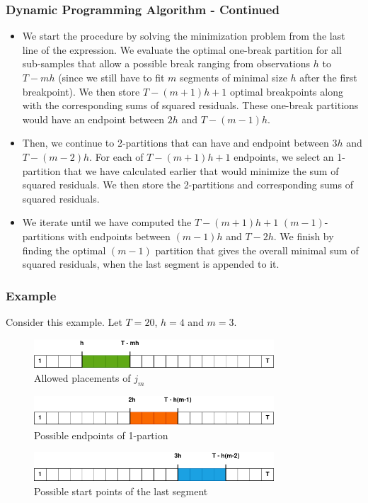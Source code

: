 \documentclass[presentation.tex]{subfiles}
\begin{document}
\begin{frame}
  \frametitle{Dynamic Programming Algorithm - Continued}
  \begin{itemize}
  \item 
We start the procedure by solving the minimization problem from the
last line of the expression. We evaluate the optimal one-break partition for all
sub-samples that allow a possible break ranging from observations $h$ to
$T - mh$ (since we still have to fit $m$ segments of minimal size $h$ after
the first breakpoint). We then store $T - (m + 1)h + 1$ optimal breakpoints
along with the corresponding sums of squared residuals. These one-break
partitions would have an endpoint between $2h$ and $T - (m-1)h$. 
\item 
Then, we continue to 2-partitions that can have and endpoint between $3h$ and
$T - (m-2)h$. For each of $T - (m + 1)h + 1$ endpoints, we select an
1-partition that we have calculated earlier that would minimize the sum of
squared residuals. We then store the 2-partitions and corresponding sums of
squared residuals.
\item 
We iterate until we have computed the $T - (m + 1)h + 1$
$(m-1)$-partitions with endpoints between $(m-1)h$ and $T-2h$.
We finish by finding the optimal $(m-1)$ partition that gives the overall
minimal sum of squared residuals, when the last segment is appended to it.
  \end{itemize}
\end{frame}

\begin{frame}
  \frametitle{Example}
  Consider this example. Let $T=20$, $h=4$ and $m=3$.
\begin{figure}[H]
  \centering
  \includegraphics[width=0.8\textwidth]{imgs/breakpoints1}
  \caption{Allowed placements of $j_m$}
  \label{plt_4_1}
\end{figure}
\begin{figure}[H]
  \centering
  \includegraphics[width=0.8\textwidth]{imgs/breakpoints2}
  \caption{Possible endpoints of 1-partion}
  \label{plt_4_2}
\end{figure}
\begin{figure}[H]
  \centering
  \includegraphics[width=0.8\textwidth]{imgs/breakpoints3}
  \caption{Possible start points of the last segment}
  \label{plt_4_3}
\end{figure}
\end{frame}
\end{document}
